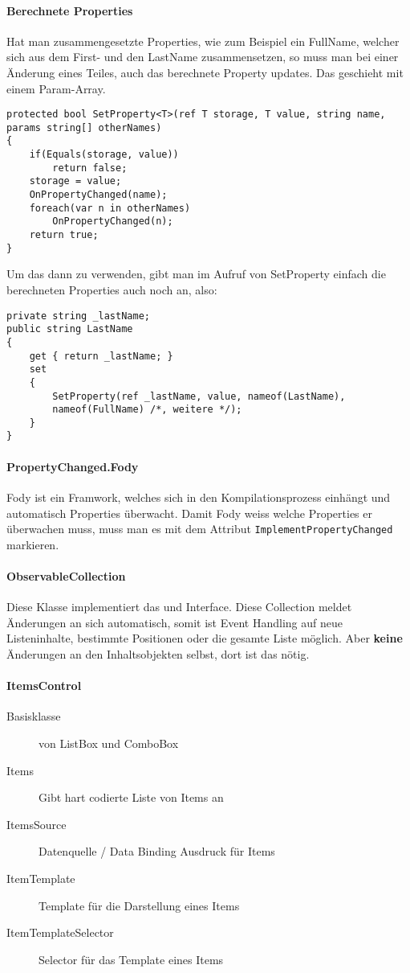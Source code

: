 \paragraph{Berechnete Properties} Hat man zusammengesetzte Properties, wie zum Beispiel ein FullName, welcher sich aus dem First- und den LastName zusammensetzen, so muss man bei einer Änderung eines Teiles, auch das berechnete Property updates. Das geschieht mit einem Param-Array.
\begin{lstlisting}
protected bool SetProperty<T>(ref T storage, T value, string name, params string[] otherNames)
{
    if(Equals(storage, value))
        return false;
    storage = value;
    OnPropertyChanged(name);
    foreach(var n in otherNames)
        OnPropertyChanged(n);
    return true;
}
\end{lstlisting}

Um das dann zu verwenden, gibt man im Aufruf von SetProperty einfach die berechneten Properties auch noch an, also:
\begin{lstlisting}
private string _lastName;
public string LastName
{
    get { return _lastName; }
    set
    {
        SetProperty(ref _lastName, value, nameof(LastName), 
        nameof(FullName) /*, weitere */);
    }
}
\end{lstlisting}


\paragraph{PropertyChanged.Fody} Fody ist ein Framwork, welches sich in den Kompilationsprozess einhängt und automatisch Properties überwacht. Damit Fody weiss welche Properties er überwachen muss, muss man es mit dem Attribut \verb+ImplementPropertyChanged+ markieren. 


\paragraph{ObservableCollection} Diese Klasse implementiert das  und  Interface. Diese Collection meldet Änderungen an sich automatisch, somit ist Event Handling auf neue Listeninhalte, bestimmte Positionen oder die gesamte Liste möglich. Aber \textbf{keine} Änderungen an den Inhaltsobjekten selbst, dort ist das  nötig.


\paragraph{ItemsControl}
\begin{description}
\item[Basisklasse] von ListBox und ComboBox
\item[Items] Gibt hart codierte Liste von Items an 
\item[ItemsSource] Datenquelle / Data Binding Ausdruck für Items
\item[ItemTemplate] Template für die Darstellung eines Items
\item[ItemTemplateSelector] Selector für das Template eines Items
\end{description}
 

